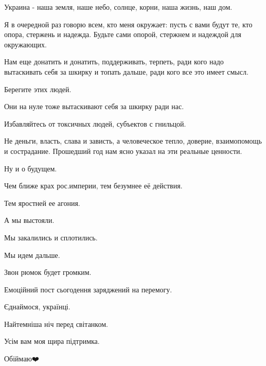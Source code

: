 Украина - наша земля, наше небо, солнце, корни, наша жизнь, наш дом.

Я в очередной раз говорю всем, кто меня окружает: пусть с вами будут те, кто
опора, стержень и надежда. Будьте сами опорой, стержнем и надеждой для
окружающих.

Нам еще донатить и донатить, поддерживать, терпеть, ради кого надо вытаскивать
себя за шкирку и топать дальше, ради кого все это имеет смысл. 

Берегите этих людей.

Они на нуле тоже вытаскивают себя за шкирку ради нас.

Избавляйтесь от токсичных людей, субъектов с гнильцой. 

Не деньги, власть, слава и зависть, а человеческое тепло, доверие, взаимопомощь
и сострадание. Прошедший год нам ясно указал на эти реальные ценности. 

Ну и о будущем. 

Чем ближе крах рос.империи, тем безумнее её действия. 

Тем яростней ее агония. 

А мы выстояли.

Мы закалились и сплотились.

Мы идем дальше. 

Звон рюмок будет громким.

Емоційний пост сьогодення заряджений на перемогу.

Єднаймося, українці.

Найтемніша ніч перед світанком.

Усім вам моя щира підтримка.

Обіймаю❤️
